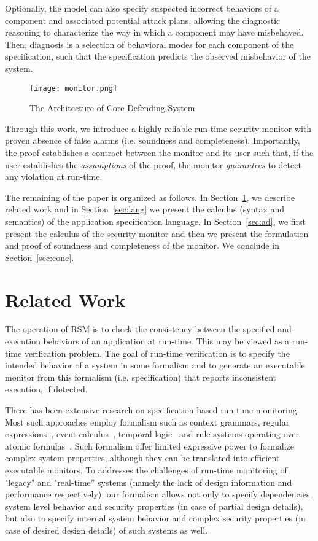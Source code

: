 \documentclass[conference]{IEEEtran}
\begin{document}
Optionally, the model can also specify suspected incorrect behaviors of a component and associated potential attack plans, allowing the diagnostic reasoning to characterize the way in which a component may have misbehaved. Then, diagnosis is a selection of behavioral modes for each component of the specification, such that the specification predicts the observed misbehavior of the system.

\enlargethispage*{0.5cm}
\begin{figure}
\texttt{[image: monitor.png]}
\caption{The Architecture of Core Defending-System}
\label{fig:monitor}
\end{figure}




Through this work, we introduce a highly reliable run-time security monitor with proven absence of false alarms (i.e. soundness and completeness). Importantly, the proof establishes a contract between the monitor and its user such that, if the user establishes the \emph{assumptions} of the proof, the monitor \emph{guarantees} to detect any violation at run-time.

The remaining of the paper is organized as follows. In Section~\ref{sec:rw}, we describe related work and in Section~\ref{sec:lang} we present the calculus (syntax and semantics) of the application specification language. In Section~\ref{sec:ad}, we first present the calculus of the security monitor and then we present the formulation and proof of soundness and completeness of the monitor. We conclude in  Section~\ref{sec:conc}.
\section{Related Work}\label{sec:rw}
The operation of RSM is to check the consistency between the specified and execution behaviors of an application at run-time. This may be viewed as a run-time verification problem. The goal of run-time verification is to specify the intended behavior of a system in some formalism and to generate an executable monitor from this formalism (i.e. specification) that reports inconsistent execution, if detected.



There has been extensive research on specification based run-time monitoring. Most such approaches employ formalism such as context grammars, regular expressions~\cite{Chen:2007}, event calculus~\cite{George:2009}, temporal logic~\cite{Bauer:2011, Barringer:2004} and rule systems operating over atomic formulas~\cite{Barringer:2010}. Such formalism offer limited expressive power to formalize complex system properties, although they can be translated into efficient executable monitors. To addresses the challenges of run-time monitoring of "legacy" and "real-time'' systems (namely the lack of design information and performance respectively), our formalism allows not only to specify dependencies, system level behavior and security properties (in case of partial design details), but
also to specify internal system behavior and complex security properties (in case of desired design details) of such systems as well.
\end{document}
